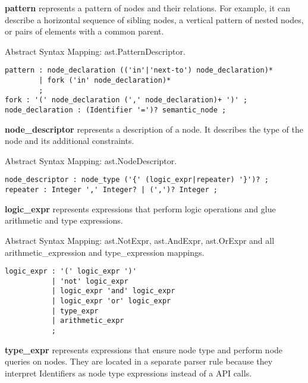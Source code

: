\documentclass[parskip=full]{uvamscse}
\begin{document}
\begin{description}
\item\textbf{pattern} represents a pattern of nodes and their relations. For example, it can describe a horizontal sequence of sibling nodes, a vertical pattern of nested nodes, or pairs of elements with a common parent. 

Abstract Syntax Mapping: ast.PatternDescriptor.

\begin{snippet}
\begin{verbatim}
pattern : node_declaration (('in'|'next-to') node_declaration)*
        | fork ('in' node_declaration)*
        ;
fork : '(' node_declaration (',' node_declaration)+ ')' ;
node_declaration : (Identifier '=')? semantic_node ;
\end{verbatim}
\end{snippet}

\item\textbf{node\_descriptor} represents a description of a node. It describes the type of the node and its additional constraints. 

Abstract Syntax Mapping: ast.NodeDescriptor.

\begin{snippet}
\begin{verbatim}
node_descriptor : node_type ('{' (logic_expr|repeater) '}')? ;
repeater : Integer ',' Integer? | (',')? Integer ;
\end{verbatim}
\end{snippet}


\item\textbf{logic\_expr} represents expressions that perform logic operations and glue arithmetic and type expressions. 

Abstract Syntax Mapping: ast.NotExpr, ast.AndExpr, ast.OrExpr and all arithmetic\_expression and type\_expression mappings.

\begin{snippet}
\begin{verbatim}
logic_expr : '(' logic_expr ')'
           | 'not' logic_expr
           | logic_expr 'and' logic_expr
           | logic_expr 'or' logic_expr
           | type_expr
           | arithmetic_expr
           ;
\end{verbatim}
\end{snippet}

\item\textbf{type\_expr} represents expressions that ensure node type and perform node queries on nodes. They are located in a separate parser rule because they interpret Identifiers as node type expressions instead of a API calls. 


\end{description}
\end{document}
